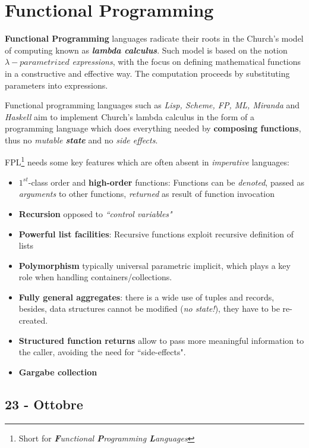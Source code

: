 \chapter{Functional Programming}
\textbf{Functional Programming} languages radicate their roots in the Church's model of computing known as \textbf{\textit{lambda calculus}}.
Such model is based on the notion $\lambda-\textit{parametrized}$ \textit{expressions},
with the focus on defining mathematical functions in a constructive and effective way.
The computation proceeds by substituting parameters into expressions.\nl

Functional programming languages such as \textit{Lisp, Scheme, FP, ML, Miranda} and \textit{Haskell} aim to implement Church's lambda calculus in the form of a programming language which does everything needed by \textbf{composing functions}, thus no \textit{mutable \textbf{state}} and no \textit{side effects}.

FPL\footnote{Short for \textit{\textbf{F}unctional \textbf{P}rogramming \textbf{L}anguages}} needs some key features which are often absent in \textit{imperative} languages:
\begin{itemize}
   \item $1^{st}$-class order and \textbf{high-order} functions:
   Functions can be \textit{denoted}, passed as \textit{arguments} to other functions, \textit{returned} as result of function invocation
   \item \textbf{Recursion} opposed to \textit{``control variables"}
   \item \textbf{Powerful list facilities}: Recursive functions exploit recursive definition of lists
   \item \textbf{Polymorphism} typically universal parametric
   implicit, 
   which plays a key role when handling containers/collections.
   \item \textbf{Fully general aggregates}:
   there is a wide use of tuples and records,
   besides,
   data structures cannot be modified (\textit{no state!}), they have to be re-created.
   \item \textbf{Structured function returns} allow to pass more meaningful information to the caller, avoiding the need for ``side-effects".
   \item \textbf{Gargabe collection}
\end{itemize}

\section*{23 - Ottobre}
